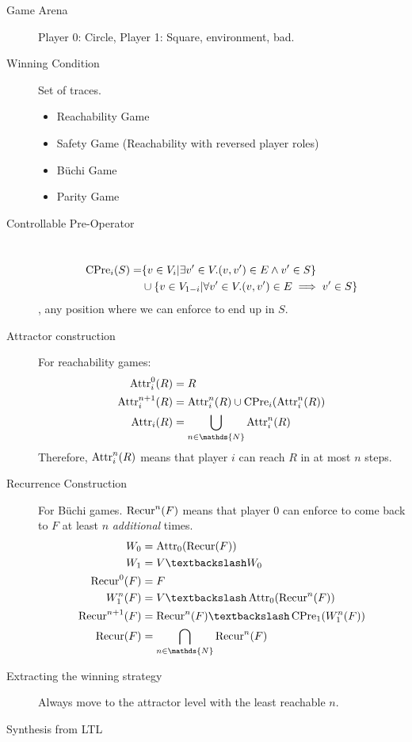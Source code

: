 \begin{description}
	\item[Game Arena] Player 0: Circle, Player 1: Square, environment, bad.
	\item[Winning Condition] Set of traces.
	\begin{itemize}
		\item Reachability Game
		\item Safety Game (Reachability with reversed player roles)
		\item Büchi Game
		\item Parity Game
	\end{itemize}
	\item[Controllable Pre-Operator] \ 
	\begin{align*} 
	\operatorname{CPre}_i(S) = &\{ v \in V_i | \exists v' \in V. (v,v') \in E \land v' \in S \} \\
	&\cup \{ v \in V_{1-i} | \forall v' \in V. (v, v') \in E \implies v' \in S \}
	\end{align*}
	\ie, any position where we can enforce to end up in $S$.
	\item[Attractor construction] For reachability games:
	\begin{align*}
		\ATTR^0_i(R) &= R \\
		\ATTR^{n+1}_i(R) &= \ATTR_i^n(R) \cup \CPRE_i(\ATTR_i^n(R))\\
		\ATTR_i(R) &= \bigcup_{n \in \mathds{N}} \ATTR_i^n(R)
	\end{align*}
	Therefore, $\operatorname{Attr}_i^n(R)$ means that player $i$ can reach $R$ in at most $n$ steps.
	\item[Recurrence Construction] For Büchi games. $\operatorname{Recur}^n(F)$ means that player 0 can enforce to come back to $F$ at least $n$ \emph{additional} times.
	\begin{align*}
		W_0 &= \ATTR_0(\RECUR(F))\\
		W_1 &= V\BS W_0\\
		\RECUR^0(F) &= F\\
		W_1^n(F) &= V\BS \ATTR_0(\RECUR^n(F))\\
		\RECUR^{n+1}(F) &= \RECUR^n(F)\BS \CPRE_1(W_1^n(F))\\
		\RECUR(F) &= \bigcap_{n \in \mathds{N}} \RECUR^n(F)
	\end{align*}
	\item[Extracting the winning strategy] Always move to the attractor level with the least reachable $n$.
	\item[Synthesis from LTL] 
	\begin{enumerate}

\end{enumerate}
\end{description}
